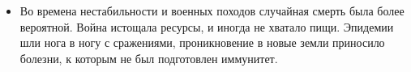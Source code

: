 \begin{itemize}

\item Во времена нестабильности и военных походов случайная смерть была более вероятной. Война истощала ресурсы, и иногда не хватало пищи. Эпидемии шли нога в ногу с сражениями, проникновение в  новые земли приносило болезни, к которым не был подготовлен иммунитет.




\end{itemize}
